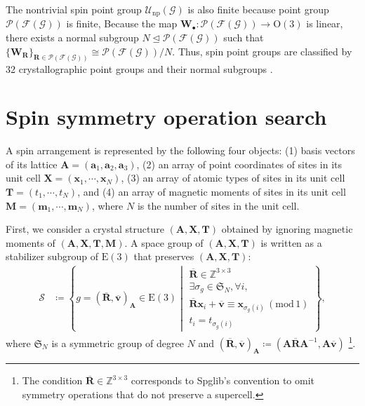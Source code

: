 \documentclass[a4paper, 11pt]{article}
\theoremstyle{definition}
\newcommand{\relmiddle}[1]{\mathrel{}\middle#1\mathrel{}}
\newcommand{\set}[2]{\left\{ #1 \relmiddle| #2 \right\}}
\begin{document}
The nontrivial spin point group $\mathcal{U}_{\mathrm{np}}(\mathcal{G})$ is also finite because point group $\mathcal{P}(\mathcal{F}(\mathcal{G}))$ is finite,
Because the map $\bm{W}_{\bullet}: \mathcal{P}(\mathcal{F}(\mathcal{G})) \to \mathrm{O}(3)$ is linear, there exists a normal subgroup $N \trianglelefteq \mathcal{P}(\mathcal{F}(\mathcal{G}))$ such that $\{ \bm{W}_{\bm{R}} \}_{ \bm{R} \in \mathcal{P}(\mathcal{F}(\mathcal{G})) } \cong \mathcal{P}(\mathcal{F}(\mathcal{G})) / N$.
Thus, spin point groups are classified by 32 crystallographic point groups and their normal subgroups \cite{Litvin:a14103}.

\section{Spin symmetry operation search}

A spin arrangement is represented by the following four objects:
(1) basis vectors of its lattice $\bm{A} = (\bm{a}_{1}, \bm{a}_{2}, \bm{a}_{3})$,
(2) an array of point coordinates of sites in its unit cell $\bm{X} = (\bm{x}_{1}, \cdots, \bm{x}_{N})$,
(3) an array of atomic types of sites in its unit cell $\bm{T} = (t_{1}, \cdots, t_{N})$,
and (4) an array of magnetic moments of sites in its unit cell $\bm{M} = (\bm{m}_{1}, \cdots, \bm{m}_{N})$,
where $N$ is the number of sites in the unit cell.

First, we consider a crystal structure $(\bm{A}, \bm{X}, \bm{T})$ obtained by ignoring magnetic moments of $(\bm{A}, \bm{X}, \bm{T}, \bm{M})$.
A space group of $(\bm{A}, \bm{X}, \bm{T})$ is written as a stabilizer subgroup of $\mathrm{E}(3)$ that preserves $(\bm{A}, \bm{X}, \bm{T})$:
\begin{align}
    \mathcal{S}
        &\coloneqq \set{
                g = ( \overline{\bm{R}}, \overline{\bm{v}} )_{\bm{A}} \in \mathrm{E}(3)
            }{
                \begin{array}{l}
                    \overline{\bm{R}} \in \mathbb{Z}^{3 \times 3} \\
                    \exists \sigma_{g} \in \mathfrak{S}_{N}, \forall i, \\
                    \overline{\bm{R}} \bm{x}_{i} + \overline{\bm{v}} \equiv \bm{x}_{\sigma_{g}(i)} \, (\mathrm{mod} \, 1) \\
                    t_{i} = t_{\sigma_{g}(i)}
                \end{array}
            },
\end{align}
where $\mathfrak{S}_{N}$ is a symmetric group of degree $N$ and $( \overline{\bm{R}}, \overline{\bm{v}} )_{\bm{A}} \coloneqq ( \bm{A}\overline{\bm{R}}\bm{A}^{-1}, \bm{A}\overline{\bm{v}} )$ \footnote {
  The condition $\overline{\bm{R}} \in \mathbb{Z}^{3 \times 3}$ corresponds to Spglib's convention to omit symmetry operations that do not preserve a supercell.
}.
\end{document}
